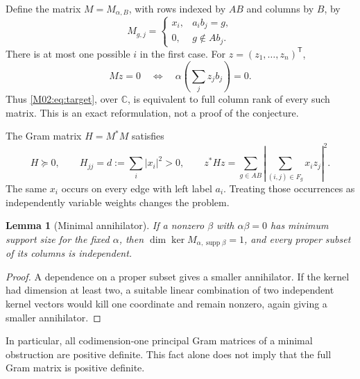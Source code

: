 \documentclass[11pt,a4paper,oneside]{report}
\newtheorem{lemma}[theorem]{Lemma}
\theoremstyle{definition}
\theoremstyle{remark}
\DeclareMathOperator{\supp}{supp}
\newcommand{\C}{\mathbb C}
\begin{document}
Define the matrix \(M=M_{\alpha,B}\), with rows indexed by \(AB\) and columns by \(B\), by
\begin{equation}\label{M02:eq:M}
M_{g,j}=
\begin{cases}
x_i,&a_i b_j=g,\\
0,&g\notin Ab_j.
\end{cases}
\end{equation}
There is at most one possible \(i\) in the first case. For \(z=(z_1,\ldots,z_n)^{\mathsf T}\),
\[
Mz=0\quad\Longleftrightarrow\quad
\alpha\left(\sum_jz_jb_j\right)=0.
\]
Thus \eqref{M02:eq:target}, over \(\C\), is equivalent to full column rank of every such matrix. This is an exact reformulation, not a proof of the conjecture.

The Gram matrix \(H=M^*M\) satisfies
\begin{equation}\label{M02:eq:energy}
H\succeq0,\qquad
H_{jj}=d:=\sum_i|x_i|^2>0,\qquad
z^*Hz=\sum_{g\in AB}
\left|\sum_{(i,j)\in F_g}x_i z_j\right|^2.
\end{equation}
The same \(x_i\) occurs on every edge with left label \(a_i\). Treating those occurrences as independently variable weights changes the problem.

\begin{lemma}[Minimal annihilator]\label{M02:lem:minimal}
If a nonzero \(\beta\) with \(\alpha\beta=0\) has minimum support size for the fixed \(\alpha\), then \(\dim\ker M_{\alpha,\supp\beta}=1\), and every proper subset of its columns is independent.
\end{lemma}
\begin{proof}
A dependence on a proper subset gives a smaller annihilator. If the kernel had dimension at least two, a suitable linear combination of two independent kernel vectors would kill one coordinate and remain nonzero, again giving a smaller annihilator.
\end{proof}
In particular, all codimension-one principal Gram matrices of a minimal obstruction are positive definite. This fact alone does not imply that the full Gram matrix is positive definite.
\end{document}
